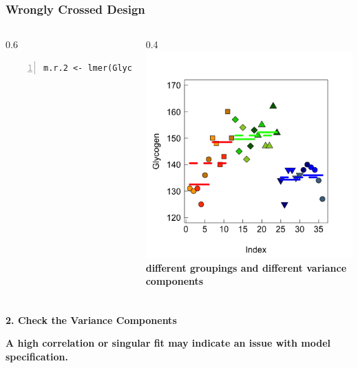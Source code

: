 \documentclass{beamer}
\begin{document}
\begin{frame}[fragile]
    \frametitle{Wrongly Crossed Design}
    \begin{columns}
        \begin{column}{0.6\textwidth}
            \tiny\begin{Verbatim}[numbers=left,numbersep=6pt,frame=single]
m.r.2 <- lmer(Glycogen~Treatment+(1|Rat)+(1|Liver), rats)
            \end{Verbatim}
            \scalebox{1}{
                
            }
        \end{column}
        \begin{column}{0.4\textwidth}
            \includegraphics[width=\textwidth]{lectures/day_7_diagnostics_of_mems/figures/unnamed-chunk-3-1.png}
            \textbf{different groupings and different variance components}
        \end{column}
    \end{columns}
\end{frame}

\begin{frame}
    \frametitle{}
    \huge\color{purple}\textbf{2. Check the Variance Components}
    \vspace{0.5cm}
    
    \normalsize\color{black}\textbf{
    A high correlation or singular fit may indicate an issue with model specification.}
\end{frame}
\end{document}

